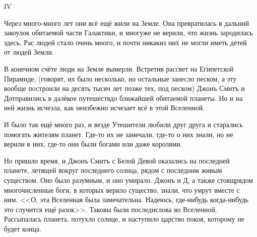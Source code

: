 \documentclass{article}
\newcommand{\И}{{\fontencoding{X2}\selectfont\CYRII}} %
\newcommand{\и}{{\fontencoding{X2}\selectfont\cyrii}} %
\newcommand{\Е}{{\fontencoding{X2}\selectfont\CYRYAT}} %
\newcommand{\е}{{\fontencoding{X2}\selectfont\cyryat}} %
\newcommand{\Ф}{{\fontencoding{X2}\selectfont\CYROTLD}} %
\newcommand{\ф}{{\fontencoding{X2}\selectfont\cyrotld}} %
\newcommand{\Ы}{{\fontencoding{X2}\selectfont\CYRIZH}} %
\newcommand{\ы}{{\fontencoding{X2}\selectfont\cyrizh}} %
\begin{document}
$ $

\begin{center}
IV
\end{center}

Через много-много лет они всё ещё жили на Земле. Она превратилась в дальний закоулок обитаемой части Галактики, и мног уже не верили, что жизнь зародилась здесь. Рас людей стало очень много, и почти никак из них не могли иметь детей от людей Земли. 

В конечном счёте люди на Земле вымерли. Встретив рассвет на Египетской Пирамиде, (говорят, их было несколько, но остальные занесло песком, а эту вообще построили на десять тысяч лет позже тех, под песком) Джонъ Смитъ и Д отправились в далёкое путешеств до ближайшей обитаемой планеты. Но и на ней жизнь исчезла, как неизбежно исчезает всё в этой Вселенной. 

И было так ещё много раз, и везде Утешители любили друг друга и старались помогать жителям планет. Где-то их не замечали, где-то о них знали, но не верили в них, где-то они были богами или даже королями. 

Но пришло время, и Джонъ Смитъ с Белой Девой оказались на последней планете, летящей вокруг последнего солнца, рядом с последним живым существом. Оно было разумным, и оно умирало. Джонъ и Д, а также стоящ рядом многочисленные боги, в которых верило существо, знали, что умрут вместе с ним. <<О, эта Вселенная была замечательна. Надеюсь, где-нибудь когда-нибудь это случится ещё разок>>. Таковы были последн слова во Вселенной. Рассыпалась планета, потухло солнце, и наступило царство покоя, которому не будет конца.
\end{document}
